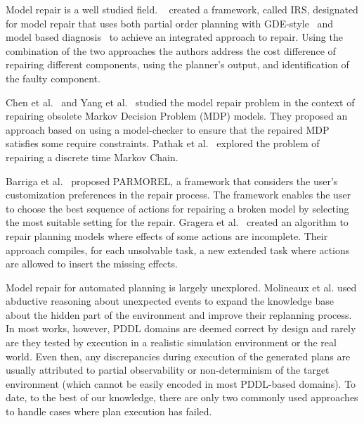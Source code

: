 \documentclass[letterpaper]{article} %
\begin{document}
Model repair is a well studied field.  ~\citet{sun1993aFramework} created a framework, called IRS, designated for model repair that uses both partial order planning with GDE-style~\cite{dekleer1987diagnosing} and model based diagnosis~\cite{dekleer2003fundamentals} to achieve an integrated approach to repair. Using the combination of the two approaches the authors address the cost difference of repairing different components, using the planner’s output, and identification of the faulty component.


Chen et al.~ and Yang et al.~ studied the model repair problem in the context of repairing obsolete Markov Decision Problem (MDP) models. They proposed an approach based on using a model-checker to ensure that the repaired MDP satisfies some require constraints. Pathak et al.~ explored the problem of repairing a discrete time Markov Chain.

Barriga et al.~ proposed PARMOREL, a framework that considers the user’s customization preferences in the repair process. The framework enables the user to choose the best sequence of actions for repairing a broken model by selecting the most suitable setting for the repair.
Gragera et al.~ created an algorithm to repair planning models where effects of some actions are incomplete. Their approach compiles, for each unsolvable task, a new extended task where actions are allowed to insert the missing effects.

Model repair for automated planning is largely unexplored. Molineaux et al. used abductive reasoning about unexpected events to expand the knowledge base about the hidden part of the environment and improve their replanning process. In most works, however, PDDL domains are deemed correct by design and rarely are they tested by execution in a realistic simulation environment or the real world. Even then, any discrepancies during execution of the generated plans are usually attributed to partial observability or non-determinism of the target environment (which cannot be easily encoded in most PDDL-based domains). To date, to the best of our knowledge, there are only two commonly used approaches to handle cases where plan execution has failed.
\end{document}
